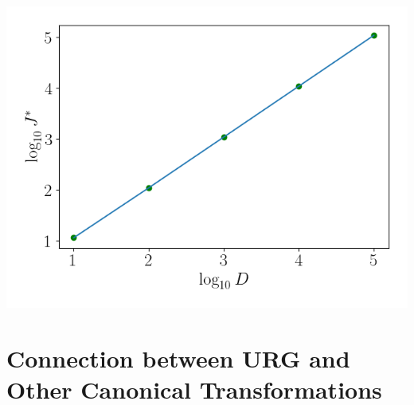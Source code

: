 \documentclass[12pt,twoside]{report}
\numberwithin{equation}{section}
\begin{document}
\begin{center}
	\includegraphics[scale=0.5]{../kondo_num/JvsD.png}
	\label{JvsD-kondo}
\end{center}

\chapter{Connection between URG and Other Canonical Transformations}
\label{urg_canonical}
\end{document}
